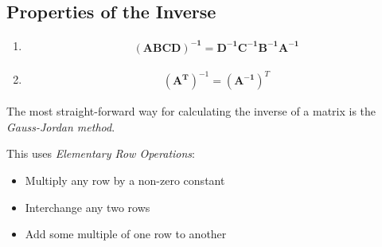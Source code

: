 \documentclass[a4paper, 11pt, normalem]{report}
\begin{document}
\subsection{Properties of the Inverse}
\begin{enumerate}
    \item   \begin{gather*}
                \mathbf{(ABCD)^{-1}} = \mathbf{D^{-1}C^{-1}B^{-1}A^{-1}}
            \end{gather*}
    \item   \begin{gather*}
                (\mathbf{A^T})^{-1} = (\mathbf{A^{-1}})^T
            \end{gather*}
\end{enumerate}
The most straight-forward way for calculating the inverse of a matrix is the \emph{Gauss-Jordan method}.

This uses \emph{Elementary Row Operations}:
\begin{itemize}
    \item Multiply any row by a non-zero constant
    \item Interchange any two rows
    \item Add some multiple of one row to another
\end{itemize}
\end{document}
